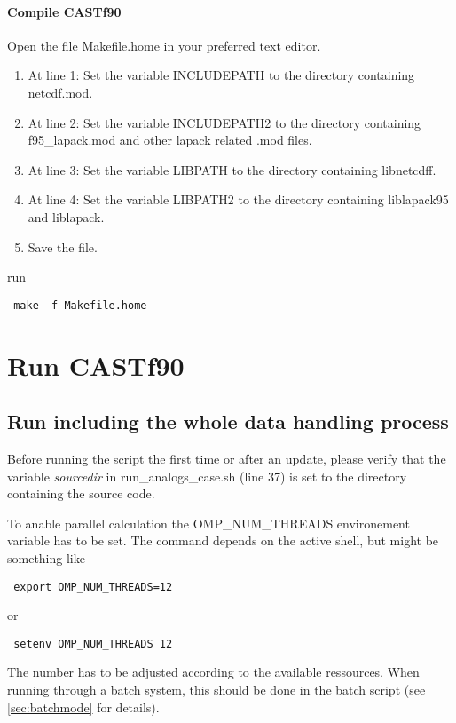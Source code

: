 \documentclass[11p,a4paper]{article}
\begin{document}
\paragraph{Compile CASTf90}
Open the file Makefile.home in your preferred text editor.
\begin{enumerate}
\item At line 1: Set the variable INCLUDEPATH to the directory containing netcdf.mod.
\item At line 2: Set the variable INCLUDEPATH2 to the directory containing f95\_lapack.mod and other lapack related .mod files.
\item At line 3: Set the variable LIBPATH to the directory containing libnetcdff.
\item At line 4: Set the variable LIBPATH2 to the directory containing liblapack95 and liblapack.
\item Save the file.
\end{enumerate}
run
\begin{verbatim}
 make -f Makefile.home
\end{verbatim}

\section{Run CASTf90}
\subsection{Run including the whole data handling process}
Before running the script the first time or after an update, please verify that the variable \textit{sourcedir} in run\_analogs\_case.sh (line 37) is set to the directory containing the source code.

To anable parallel calculation the OMP\_NUM\_THREADS environement variable has to be set. The command depends on the active shell, but might be something like 
\begin{verbatim}
 export OMP_NUM_THREADS=12
\end{verbatim}
or 
\begin{verbatim}
 setenv OMP_NUM_THREADS 12
\end{verbatim}
The number has to be adjusted according to the available ressources.
When running through a batch system, this should be done in the batch script (see  \autoref{sec:batchmode} for details).
\end{document}
